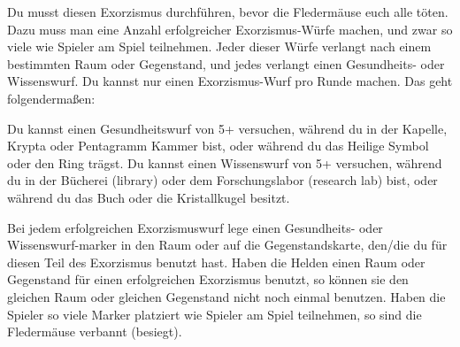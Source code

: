 





Du musst diesen Exorzismus durchführen, bevor die Fledermäuse euch alle töten. Dazu muss man eine Anzahl erfolgreicher Exorzismus-Würfe machen, und zwar so viele wie Spieler am Spiel teilnehmen. Jeder dieser Würfe verlangt nach einem bestimmten Raum oder Gegenstand, und jedes verlangt einen Gesundheits- oder Wissenswurf.
Du kannst nur einen Exorzismus-Wurf pro Runde machen. Das geht folgendermaßen:

  \begin{itemize}
    \bitem Du kannst einen Gesundheitswurf von 5+ versuchen, während du in der Kapelle, Krypta oder Pentagramm Kammer bist, oder während du das Heilige Symbol oder den Ring trägst.
    \bitem Du kannst einen Wissenswurf von 5+ versuchen, während du in der Bücherei (library) oder dem Forschungslabor (research lab) bist, oder während du das Buch oder die Kristallkugel besitzt.
    \end{itemize}

\newpage Bei jedem erfolgreichen Exorzismuswurf lege einen Gesundheits- oder Wissenswurf-marker in den Raum oder auf die Gegenstandskarte, den/die du für diesen Teil des Exorzismus benutzt hast.
Haben die Helden einen Raum oder Gegenstand für einen erfolgreichen Exorzismus benutzt, so können sie den gleichen Raum oder gleichen Gegenstand nicht noch einmal benutzen.
Haben die Spieler so viele Marker platziert wie Spieler am Spiel teilnehmen, so sind die Fledermäuse verbannt (besiegt).


